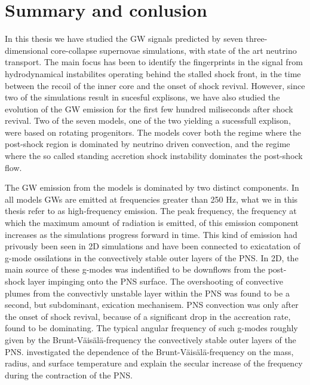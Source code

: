 \chapter{Summary and conlusion}
In this thesis we have studied the GW signals predicted
by seven three-dimensional core-collapse supernovae simulations, with state of the art 
neutrino transport. The main focus has been to identify the fingerprints in the signal
from hydrodynamical instabilites operating behind the stalled shock front, in the time between the
recoil of the inner core and the onset of shock revival. However, since two of the simulations
result in sucesful explisons, we have also studied the evolution of the GW emission
for the first few hundred miliseconds after shock revival. Two of the seven models, one of the two
yielding a sucessfull explison, were based on rotating progenitors. The models cover both the
regime where the post-shock region is dominated by neutrino driven convection, and the regime where
the so called standing accretion shock instability dominates the post-shock flow.

The GW emission from the models is dominated by two distinct components. In all models
GWs are emitted at frequencies greater than 250 Hz, what we in this thesis refer to as 
high-frequency emission. The peak frequency, the frequency at which the maximum amount of radiation 
is emitted, of this emission component increases as the simulations progress forward in time. 
This kind of emission had privously been seen in 2D simulations \citep{marek_08,murphy_09,mueller_13}
and have been connected to exicatation of g-mode ossilations in the convectively stable outer layers of the PNS.
In 2D, the main source of these g-modes was indentified to be downflows from the post-shock layer impinging onto the PNS surface.
The overshooting of convective plumes from the convectivly unstable layer within the PNS was found to be a second, but subdominant, exication
mechanisem. PNS convection was only after the onset of shock revival, because of a significant drop in the accreation rate, found to 
be dominating.  The typical angular frequency of such g-modes roughly given by the Brunt-V\"{a}is\"{a}l\"{a}-frequency
the convectively stable outer layers of the PNS. \citet{mueller_13} investigated the dependence
of the Brunt-V\"{a}is\"{a}l\"{a}-frequency on the mass, radius, and surface temperature and explain the secular
increase of the frequency during the contraction of the PNS.

